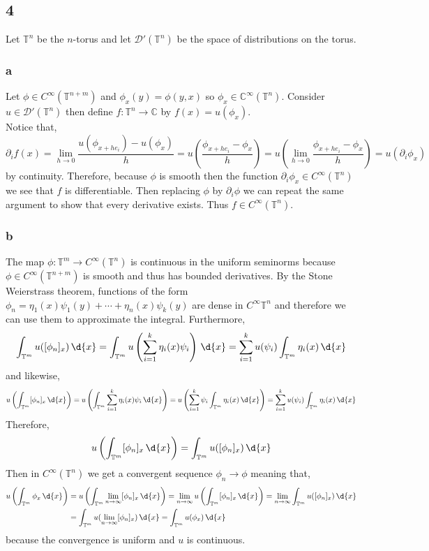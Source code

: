 \documentclass[12pt]{article}
\renewcommand{\C}{\mathbb{C}}
\renewcommand{\T}{\mathbb{T}}
\renewcommand{\D}{\mathcal{D}}
\begin{document}
\subsection{4}

Let $\T^n$ be the $n$-torus and let $\D'(\T^n)$ be the space of distributions on the torus.

\subsubsection{a}

Let $\phi \in C^{\infty}(\T^{n+m})$ and $\phi_x(y) = \phi(y,x)$ so $\phi_x \in \C^{\infty}(\T^n)$. Consider $u \in \D'(\T^n)$ then define $f : \T^n \to \C$ by $f(x) = u(\phi_x)$. 
\bigskip\\
Notice that,
\[ \partial_i f(x) = \lim_{h \to 0} \frac{u(\phi_{x + h e_i}) - u(\phi_x)}{h} = u \left( \frac{\phi_{x + h e_i} - \phi_x}{h} \right) = u \left( \lim_{h \to 0} \frac{\phi_{x + h e_i} - \phi_x}{h} \right) = u(\partial_i \phi_x) \]
by continuity. Therefore, because $\phi$ is smooth then the function $\partial_i \phi_x \in C^{\infty}(\T^n)$ we see that $f$ is differentiable. Then replacing $\phi$ by $\partial_i \phi$ we can repeat the same argument to show that every derivative exists. Thus $f \in C^\infty(\T^n)$.

\subsubsection{b}

The map $\phi : \T^m \to C^{\infty}(\T^n)$ is continuous in the uniform seminorms because $\phi \in C^{\infty}(\T^{n+m})$ is smooth and thus has bounded derivatives. By the Stone Weierstrass theorem, functions of the form $\phi_n = \eta_1(x) \psi_1(y) + \cdots + \eta_n(x) \psi_k(y)$ are dense in $C^{\infty}{\T^n}$ and therefore we can use them to approximate the integral. Furthermore,
\[ \int_{\T^m} u([\phi_n]_x) \, \d{x} = \int_{\T^m} u \left( \sum_{i = 1}^k \eta_i(x) \psi_i \right) \, \d{x} = \sum_{i = 1}^k u(\psi_i) \int_{\T^m} \eta_i(x)  \, \d{x}  \]
and likewise,
\[ u \left( \int_{\T^m} [\phi_n]_x \, \d{x} \right) = u \left( \int_{\T^m} \sum_{i = 1}^k \eta_i(x) \psi_i \, \d{x} \right) = u \left( \sum_{i = 1}^k \psi_i \int_{\T^m} \eta_i(x) \, \d{x} \right) = \sum_{i = 1}^k u(\psi_i) \int_{\T^m} \eta_i(x) \, \d{x} \]
Therefore,
\[ u \left( \int_{\T^m} [\phi_n]_x \, \d{x} \right) = \int_{\T^m} u([\phi_n]_x) \, \d{x} \]
Then in $C^{\infty}(\T^n)$ we get a convergent sequence $\phi_n \to \phi$ meaning that,
\begin{align*}
u \left( \int_{\T^m} \phi_x \, \d{x} \right) & = u \left( \int_{\T^m} \lim_{n \to \infty} [\phi_n]_x \, \d{x} \right) = \lim_{n \to \infty} u \left( \int_{\T^m} [\phi_n]_x \, \d{x} \right) = \lim_{n \to \infty} \int_{\T^m} u([\phi_n]_x) \, \d{x}
\\
& = \int_{\T^m} u( \lim_{n \to \infty} [\phi_n]_x) \, \d{x} = \int_{\T^m} u(\phi_x) \, \d{x}
\end{align*}
because the convergence is uniform and $u$ is continuous.
\end{document}
